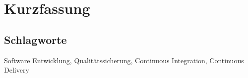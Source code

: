 \chapter*{Kurzfassung}

\noindent



\bigbreak
\section*{Schlagworte}
Software Entwicklung, Qualitätssicherung, Continuous Integration,
Continuous Delivery

